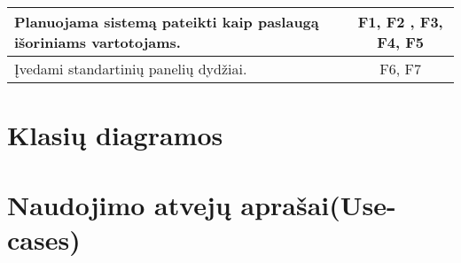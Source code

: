 \documentclass[a4paper,12pt]{article}
\begin{document}
\begin{frame}
\begin{tabular}{|l|c|}
Planuojama sistemą pateikti kaip paslaugą išoriniams vartotojams.                                                                                                                                                                                                                                                                                         												& F1, F2	, F3, F4, F5		\\ \hline

Įvedami standartinių panelių dydžiai.			& F6, F7						\\ \hline

\end{tabular}
\end{frame}


\section{Klasių diagramos}

\section{Naudojimo atvejų aprašai(Use-cases)}



\end{document}
